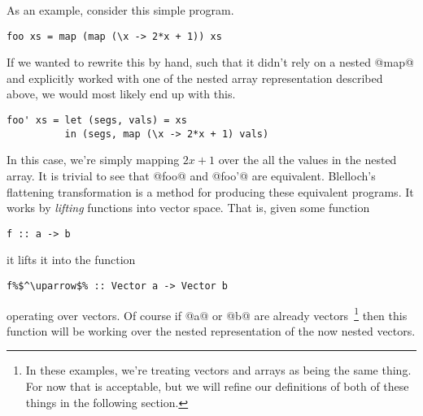 As an example, consider this simple program.
%
\begin{lstlisting}
foo xs = map (map (\x -> 2*x + 1)) xs
\end{lstlisting}
%
If we wanted to rewrite this by hand, such that it didn't rely on a nested @map@ and explicitly worked with one of the nested array representation described above, we would most likely end up with this.
%
\begin{lstlisting}
foo' xs = let (segs, vals) = xs
          in (segs, map (\x -> 2*x + 1) vals)
\end{lstlisting}
%
In this case, we're simply mapping $2x+1$ over the all the values in the nested array. It is trivial to see that @foo@ and @foo'@ are equivalent. Blelloch's flattening transformation is a method for producing these equivalent programs. It works by \emph{lifting} functions into vector space. That is, given some function
%
\begin{lstlisting}
f :: a -> b
\end{lstlisting}
%
it lifts it into the function
%
\begin{lstlisting}
f%$^\uparrow$% :: Vector a -> Vector b
\end{lstlisting}
%
operating over vectors. Of course if @a@ or @b@ are already vectors~\footnote{In these examples, we're treating vectors and arrays as being the same thing. For now that is acceptable, but we will refine our definitions of both of these things in the following section.} then this function will be working over the nested representation of the now nested vectors.

